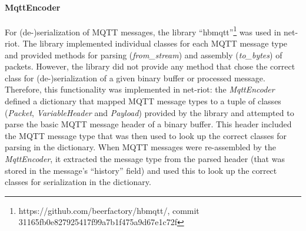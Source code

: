 \paragraph{MqttEncoder} For (de-)serialization of \ac{MQTT} messages, the library \enquote{hbmqtt}\footnote{https://github.com/beerfactory/hbmqtt/, commit 31165fb0e827925417f99a7b1f475a9d67e1c72f} was used in net-riot. The library implemented individual classes for each \ac{MQTT} message type and provided methods for parsing (\emph{from\_stream}) and assembly (\emph{to\_bytes}) of packets. However, the library did not provide any method that chose the correct class for (de-)serialization of a given binary buffer or processed message. Therefore, this functionality was implemented in net-riot: the \emph{MqttEncoder} defined a dictionary that mapped \ac{MQTT} message types to a tuple of classes (\emph{Packet}, \emph{VariableHeader} and \emph{Payload}) provided by the library and attempted to parse the basic \ac{MQTT} message header of a binary buffer. This header included the \ac{MQTT} message type that was then used to look up the correct classes for parsing in the dictionary. When \ac{MQTT} messages were re-assembled by the \emph{MqttEncoder}, it extracted the message type from the parsed header (that was stored in the message's \enquote{history} field) and used this to look up the correct classes for serialization in the dictionary.

